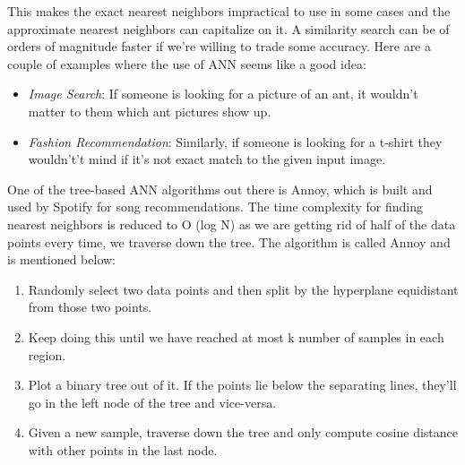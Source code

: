 \documentclass[12pt,twocolumn,letterpaper,Times New Roman]{article}
\begin{document}
This makes the exact nearest neighbors impractical to use in some cases and the approximate nearest neighbors can capitalize on it. A similarity search can be of orders of magnitude faster if we’re willing to trade some accuracy. Here are a couple of examples where the use of ANN seems like a good idea\cite{trabelsi}:

\begin{itemize}
  \item \textit{Image Search}: If someone is looking for a picture of an ant, it wouldn't matter to them which ant pictures show up.
  \item \textit{Fashion Recommendation}: Similarly, if someone is looking for a t-shirt they wouldn't’t mind if it’s not exact match to the given input image.
\end{itemize}

One of the tree-based ANN algorithms out there is Annoy, which is built and used by Spotify for song recommendations. The time complexity for finding nearest neighbors is reduced to 
O (log N) as we are getting rid of half of the data points every time, we traverse down the tree. The algorithm is called Annoy\cite{erikbern} and is mentioned below:

\begin{enumerate}
  \item Randomly select two data points and then split by the hyperplane equidistant from those two points. 
  \item Keep doing this until we have reached at most k number of samples in each region.
  \item Plot a binary tree out of it. If the points lie below the separating lines, they’ll go in the left node of the tree and vice-versa.
  \item Given a new sample, traverse down the tree and only compute cosine distance with other points in the last node.
\end{enumerate}
\end{document}
